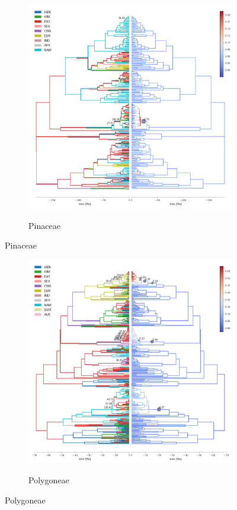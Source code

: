 \begin{figure}
  \ContinuedFloat
\begin{subfigure}{\textwidth}
\centering
\includegraphics[width=.99\linewidth]{figures/Pinaceae-supfig.pdf}
\label{fig:allium}
\caption{Pinaceae}
\end{subfigure}
\end{figure}

\begin{figure}
  \ContinuedFloat
\begin{subfigure}{\textwidth}
\centering
\includegraphics[width=.99\linewidth]{figures/Polygoneae-supfig.pdf}
\label{fig:allium}
\caption{Polygoneae}
\end{subfigure}
\end{figure}

